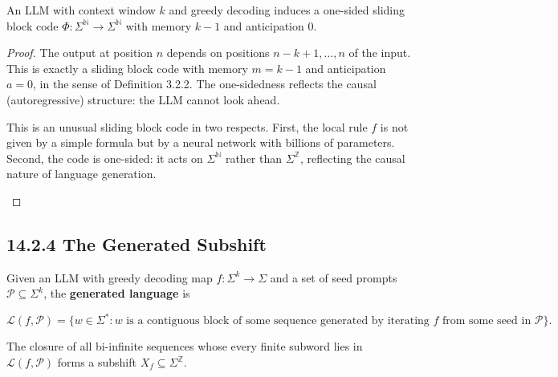 \begin{proposition}
An LLM with context window $k$ and greedy decoding induces a one-sided sliding block code $\Phi: \Sigma^{\mathbb{N}} \to \Sigma^{\mathbb{N}}$ with memory $k-1$ and anticipation $0$.


\end{proposition}

\begin{proof}
The output at position $n$ depends on positions $n-k+1, \ldots, n$ of the input. This is exactly a sliding block code with memory $m = k - 1$ and anticipation $a = 0$, in the sense of Definition 3.2.2. The one-sidedness reflects the causal (autoregressive) structure: the LLM cannot look ahead. 

\begin{remark}
This is an unusual sliding block code in two respects. First, the local rule $f$ is not given by a simple formula but by a neural network with billions of parameters. Second, the code is one-sided: it acts on $\Sigma^{\mathbb{N}}$ rather than $\Sigma^{\mathbb{Z}}$, reflecting the causal nature of language generation.
\end{remark}

\end{proof}

\subsection{14.2.4 The Generated Subshift}

\begin{definition}
Given an LLM with greedy decoding map $f: \Sigma^k \to \Sigma$ and a set of seed prompts $\mathcal{P} \subseteq \Sigma^k$, the \textbf{generated language} is

\[\mathcal{L}(f, \mathcal{P}) = \{ w \in \Sigma^* : w \text{ is a contiguous block of some sequence generated by iterating } f \text{ from some seed in } \mathcal{P} \} .\]

The closure of all bi-infinite sequences whose every finite subword lies in $\mathcal{L}(f, \mathcal{P})$ forms a subshift $X_f \subseteq \Sigma^{\mathbb{Z}}$.
\end{definition}


